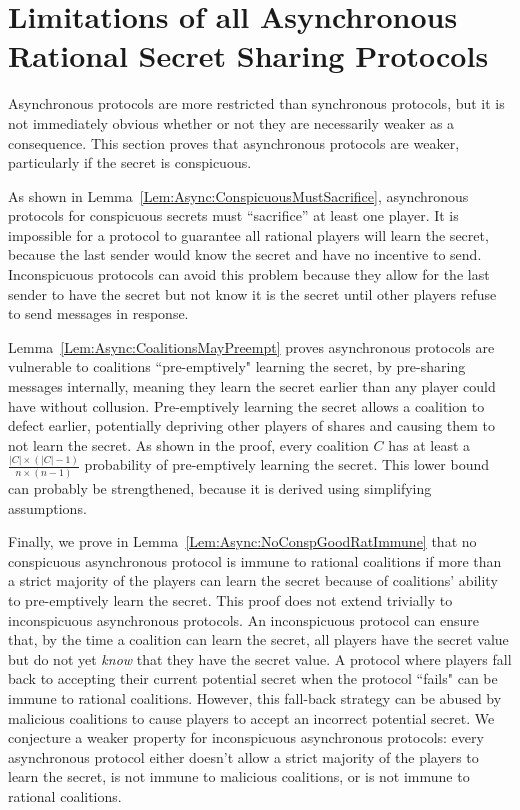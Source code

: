 \documentclass{dalcsthesis}
\begin{document}
\section{Limitations of all Asynchronous Rational Secret Sharing Protocols}
\label{Sec:AsympWeak}

Asynchronous protocols are more restricted than synchronous protocols, but it is not immediately obvious whether or not they are necessarily weaker as a consequence. This section proves that asynchronous protocols are weaker, particularly if the secret is conspicuous.

As shown in Lemma~\ref{Lem:Async:ConspicuousMustSacrifice}, asynchronous protocols for conspicuous secrets must ``sacrifice'' at least one player. It is impossible for a protocol to guarantee all rational players will learn the secret, because the last sender would know the secret and have no incentive to send. Inconspicuous protocols can avoid this problem because they allow for the last sender to have the secret but not know it is the secret until other players refuse to send messages in response.

Lemma~\ref{Lem:Async:CoalitionsMayPreempt} proves asynchronous protocols are vulnerable to coalitions ``pre-emptively" learning the secret, by pre-sharing messages internally, meaning they learn the secret earlier than any player could have without collusion. Pre-emptively learning the secret allows a coalition to defect earlier, potentially depriving other players of shares and causing them to not learn the secret. As shown in the proof, every coalition $C$ has at least a $\frac{|C| \times (|C| - 1)}{n \times (n-1)}$ probability of pre-emptively learning the secret. This lower bound can probably be strengthened, because it is derived using simplifying assumptions.

Finally, we prove in Lemma~\ref{Lem:Async:NoConspGoodRatImmune} that no conspicuous asynchronous protocol is immune to rational coalitions if more than a strict majority of the players can learn the secret because of coalitions' ability to pre-emptively learn the secret. This proof does not extend trivially to inconspicuous asynchronous protocols. An inconspicuous protocol can ensure that, by the time a coalition can learn the secret, all players have the secret value but do not yet \emph{know} that they have the secret value. A protocol where players fall back to accepting their current potential secret when the protocol ``fails" can be immune to rational coalitions. However, this fall-back strategy can be abused by malicious coalitions to cause players to accept an incorrect potential secret. We conjecture a weaker property for inconspicuous asynchronous protocols: every asynchronous protocol either doesn't allow a strict majority of the players to learn the secret, is not immune to malicious coalitions, or is not immune to rational coalitions.
\end{document}
